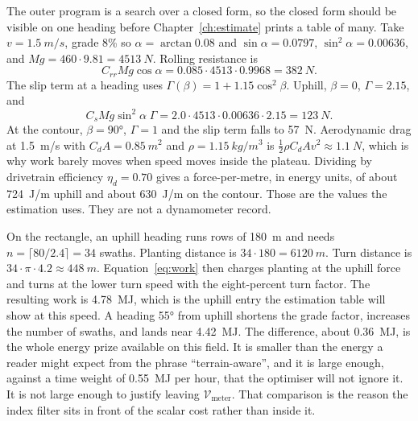 The outer program is a search over a closed form, so the closed form should be visible on one heading before Chapter~\ref{ch:estimate} prints a table of many. Take \(v=\SI{1.5}{m/s}\), grade \num{8}\% so \(\alpha=\arctan 0.08\) and \(\sin\alpha=\num{0.0797}\), \(\sin^2\alpha=\num{0.00636}\), and \(Mg=460\cdot 9.81=\SI{4513}{N}\). Rolling resistance is
\begin{equation}
\label{eq:frr}
C_{rr} Mg\cos\alpha = 0.085\cdot 4513\cdot 0.9968 = \SI{382}{N}.
\end{equation}
The slip term at a heading uses \(\Gamma(\beta)=1+1.15\cos^2\beta\). Uphill, \(\beta=0\), \(\Gamma=2.15\), and
\begin{equation}
\label{eq:fslip}
C_s Mg\sin^2\alpha\;\Gamma = 2.0\cdot 4513\cdot 0.00636\cdot 2.15 = \SI{123}{N}.
\end{equation}
At the contour, \(\beta=\ang{90}\), \(\Gamma=1\) and the slip term falls to \SI{57}{N}. Aerodynamic drag at \SI{1.5}{m/s} with \(C_dA=\SI{0.85}{m^2}\) and \(\rho=\SI{1.15}{kg/m^3}\) is \(\tfrac12\rho C_dA v^2\approx\SI{1.1}{N}\), which is why work barely moves when speed moves inside the plateau. Dividing by drivetrain efficiency \(\eta_d=0.70\) gives a force-per-metre, in energy units, of about \SI{724}{J/m} uphill and about \SI{630}{J/m} on the contour. Those are the values the estimation uses. They are not a dynamometer record.

On the rectangle, an uphill heading runs rows of \SI{180}{m} and needs \(n=\lceil 80/2.4\rceil=34\) swaths. Planting distance is \(34\cdot 180=\SI{6120}{m}\). Turn distance is \(34\cdot\pi\cdot 4.2\approx\SI{448}{m}\). Equation~\eqref{eq:work} then charges planting at the uphill force and turns at the lower turn speed with the eight-percent turn factor. The resulting work is \SI{4.78}{MJ}, which is the uphill entry the estimation table will show at this speed. A heading \ang{55} from uphill shortens the grade factor, increases the number of swaths, and lands near \SI{4.42}{MJ}. The difference, about \SI{0.36}{MJ}, is the whole energy prize available on this field. It is smaller than the energy a reader might expect from the phrase ``terrain-aware'', and it is large enough, against a time weight of \SI{0.55}{MJ} per hour, that the optimiser will not ignore it. It is not large enough to justify leaving \(\mathcal{V}_{\mathrm{meter}}\). That comparison is the reason the index filter sits in front of the scalar cost rather than inside it.

